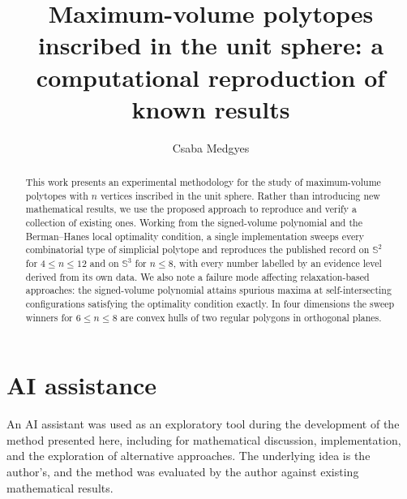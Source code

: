 \documentclass[11pt,reqno]{amsart}
\title[Maximum-volume inscribed polytopes]
{Maximum-volume polytopes inscribed in the unit sphere:
a computational reproduction of known results}
\author{Csaba Medgyes}
\theoremstyle{definition}
\begin{document}
\begin{abstract}
This work presents an experimental methodology for the study of
maximum-volume polytopes with $n$ vertices inscribed in the unit sphere.
Rather than introducing new mathematical results, we use the proposed
approach to reproduce and verify a collection of existing ones. Working from
the signed-volume polynomial and the Berman--Hanes local optimality condition, a
single implementation sweeps every combinatorial type of simplicial polytope
and reproduces the published record on $\mathbb{S}^{2}$ for
$4 \leq n \leq 12$ and on $\mathbb{S}^{3}$ for $n \leq 8$, with every number
labelled by an evidence level derived from its own data. We also note a
failure mode affecting relaxation-based approaches: the signed-volume
polynomial attains spurious maxima at self-intersecting configurations
satisfying the optimality condition exactly. In four dimensions the sweep
winners for $6 \leq n \leq 8$ are convex hulls of two regular polygons in
orthogonal planes.
\end{abstract}
\maketitle






\section*{AI assistance}
An AI assistant was used as an exploratory tool during the development of the
method presented here, including for mathematical discussion, implementation,
and the exploration of alternative approaches. The underlying idea is the
author's, and the method was evaluated by the author against existing
mathematical results.
\end{document}
